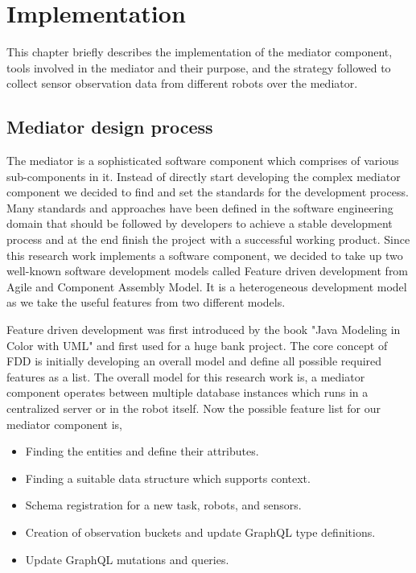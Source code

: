 

	\let\cleardoublepage\clearpage
\chapter{Implementation} \label{sec:implementation}
This chapter briefly describes the implementation of the mediator component, tools involved in the mediator and their purpose, and the strategy followed to collect sensor observation data from different robots over the mediator. 

	\section{Mediator design process}
	 The mediator is a sophisticated software component which comprises of various sub-components in it. Instead of directly start developing the complex mediator component we decided to find and set the standards for the development process. Many standards and approaches have been defined in the software engineering domain that should be followed by developers to achieve a stable development process and at the end finish the project with a successful working product. Since this research work implements a software component, we decided to take up two well-known software development models called Feature driven development from Agile and Component Assembly Model. It is a heterogeneous development model as we take the useful features from two different models.
	
	Feature driven development was first introduced by the book "Java Modeling in Color with UML" \cite{misc15} and first used for a huge bank project. The core concept of FDD is initially developing an overall model and define all possible required features as a list. The overall model for this research work is, a mediator component operates between multiple database instances which runs in a centralized server or in the robot itself. Now the possible feature list for our mediator component is, 
	
	\begin{itemize}
		\item Finding the entities and define their attributes.
		\item Finding a suitable data structure which supports context.
		\item Schema registration for a new task, robots, and sensors.
		\item Creation of observation buckets and update GraphQL type definitions.
		\item Update GraphQL mutations and queries.
	\end{itemize}
	
